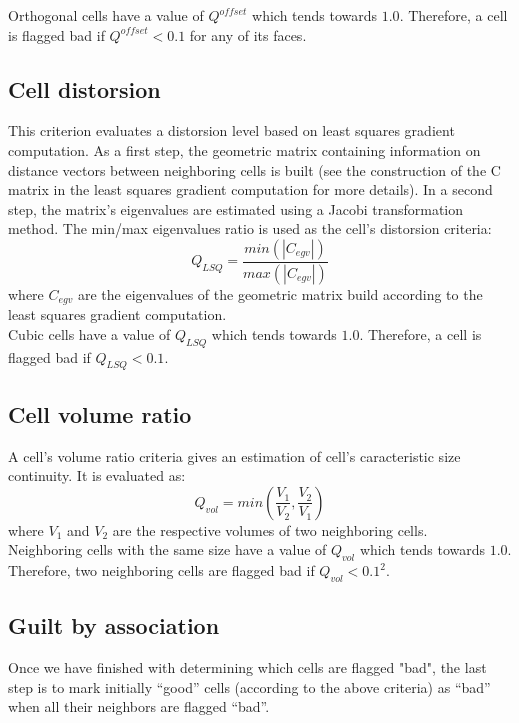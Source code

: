 Orthogonal cells have a value of $Q^{offset}$ which tends towards $1.0$.
Therefore, a cell is flagged bad if $ Q^{offset} < 0.1$ for any of its faces.

\subsection*{Cell distorsion}

This criterion evaluates a distorsion level based on least squares gradient
computation. As a first step, the geometric matrix containing information on distance
vectors between neighboring cells is built (see the construction of the C matrix
in the least squares gradient computation for more details). In a second step,
the matrix's eigenvalues are estimated using a Jacobi transformation method.
The min/max eigenvalues ratio is used as the cell's distorsion criteria:
\[Q_{LSQ} = \frac{min(|C_{egv}|)}{max(|C_{egv}|)}\]
where \(C_{egv}\) are the eigenvalues of the geometric matrix build according to
the least squares gradient computation.\\
Cubic cells have a value of \(Q_{LSQ}\) which tends towards $1.0$.
Therefore, a cell is flagged bad if \(Q_{LSQ} < 0.1\).

\subsection*{Cell volume ratio}

A cell's volume ratio criteria gives an estimation of cell's caracteristic size
continuity. It is evaluated as:
\[Q_{vol} = min\left(\frac{V_{1}}{V_{2}}, \frac{V_{2}}{V_{1}}\right)\]
where \(V_{1}\) and \(V_{2}\) are the respective volumes of two neighboring cells.\\
Neighboring cells with the same size have a value of \(Q_{vol}\) which tends
towards $1.0$.
Therefore, two neighboring cells are flagged bad if \(Q_{vol} < 0.1^{2}\).

\subsection*{Guilt by association}

Once we have finished with determining which cells are flagged "bad", the last
step is to mark initially ``good'' cells (according to the above criteria) as
``bad'' when all their neighbors are flagged ``bad''.
